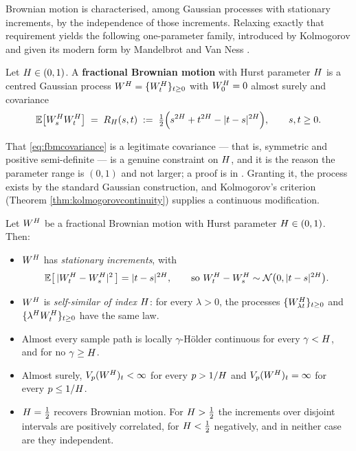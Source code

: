 Brownian motion is characterised, among Gaussian processes with stationary increments, by the
independence of those increments. Relaxing exactly that requirement yields
the following one-parameter family, introduced by Kolmogorov and given its modern form by Mandelbrot
and Van Ness \cite{mandelbrotvanness1968}.

\begin{definition}\label{def:fbm}
Let $H \in (0,1)$. A \textbf{fractional Brownian motion} with Hurst parameter $H$ is a
centred Gaussian process $W^{H} = \{W^{H}_t\}_{t\geq0}$ with $W^{H}_0 = 0$ almost surely and covariance
\begin{equation}\label{eq:fbmcovariance}
\mathbb{E}\bigl[W^{H}_s W^{H}_t\bigr] \;=\; R_H(s,t) \;:=\; \tfrac12\Bigl( s^{2H} + t^{2H} - |t-s|^{2H} \Bigr),
\qquad s,t \geq 0 .
\end{equation}
\end{definition}

That \eqref{eq:fbmcovariance} is a legitimate covariance --- that is, symmetric and positive
semi-definite --- is a genuine constraint on $H$, and it is the reason the parameter range is
$(0,1)$ and not larger; a proof is in \cite[Ch.\ 7]{marcusrosen2006}. Granting it, the process
exists by the standard Gaussian construction, and Kolmogorov's criterion (Theorem
\ref{thm:kolmogorovcontinuity}) supplies a continuous modification.

\begin{proposition}\label{prop:fbmproperties}
Let $W^{H}$ be a fractional Brownian motion with Hurst parameter $H \in (0,1)$. Then:
\begin{itemize}
    \item[a)] $W^{H}$ has \emph{stationary increments}, with
    \begin{equation}\label{eq:fbmincrement}
        \mathbb{E}\bigl[\,|W^{H}_t - W^{H}_s|^2\,\bigr] = |t-s|^{2H}, \qquad \text{so } W^{H}_t - W^{H}_s \sim \mathcal{N}\bigl(0, |t-s|^{2H}\bigr).
    \end{equation}
    \item[b)] $W^{H}$ is \emph{self-similar of index $H$}: for every $\lambda>0$, the processes
    $\{W^{H}_{\lambda t}\}_{t\geq0}$ and $\{\lambda^{H}W^{H}_t\}_{t \geq 0}$ have the same law.
    \item[c)] Almost every sample path is locally $\gamma$-Hölder continuous for every
    $\gamma < H$, and for no $\gamma \geq H$.
    \item[d)] Almost surely, $V_p(W^{H})_t < \infty$ for every $p > 1/H$ and $V_p(W^{H})_t = \infty$
    for every $p \leq 1/H$.
    \item[e)] $H = \tfrac12$ recovers Brownian motion. For $H > \tfrac12$ the increments
    over disjoint intervals are positively correlated, for $H < \tfrac12$ negatively, and in
    neither case are they independent.
\end{itemize}
\end{proposition}

